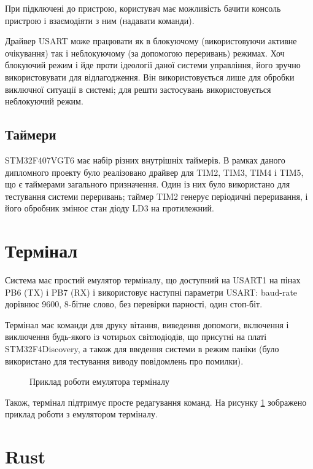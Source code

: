 \documentclass[main.tex]{subfiles}
\begin{document}
  При підключені до пристрою, користувач має можливість бачити консоль пристрою і взаємодіяти з ним (надавати команди).

  Драйвер USART може працювати як в блокуючому (використовуючи активне очікування) так і неблокуючому (за допомогою переривань) режимах. Хоч блокуючий режим і йде проти ідеології даної системи управління, його зручно використовувати для відлагодження. Він використовується лише для обробки виключної ситуації в системі; для решти застосувань використовується неблокуючий режим.

\subsection{Таймери}

STM32F407VGT6 має набір різних внутрішніх таймерів. В рамках даного дипломного проекту було реалізовано драйвер для TIM2, TIM3, TIM4 і TIM5, що є таймерами загального призначення. Один із них було використано для тестування системи переривань; таймер TIM2 генерує періодичні переривання, і його обробник змінює стан діоду LD3 на протилежний.

\section{Термінал}

Система має простий емулятор терміналу, що доступний на USART1 на пінах PB6 (TX) і PB7 (RX) і використовує наступні параметри USART: baud-rate дорівнює 9600, 8-бітне слово, без перевірки парності, один стоп-біт.

Термінал має команди для друку вітання, виведення допомоги, включення і виключення будь-якого із чотирьох світлодіодів, що присутні на платі STM32F4Discovery, а також для введення системи в режим паніки (було використано для тестування виводу повідомлень про помилки).

\begin{figure}[!p]
  \caption{Приклад роботи емулятора терміналу}\label{fig:terminal}
\end{figure}

Також, термінал підтримує просте редагування команд. На рисунку \ref{fig:terminal} зображено приклад роботи з емулятором терміналу.

\section{Rust}
\end{document}
